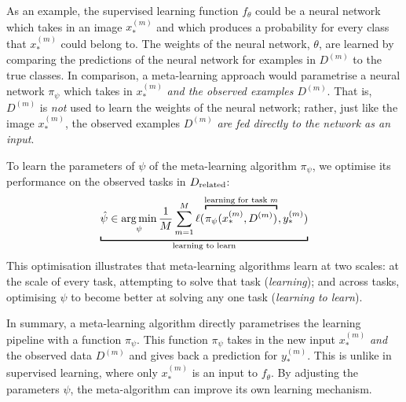 \documentclass[12pt, twoside]{report}
\newcommand{\xrprefix}[1]{xr-#1}
\begin{document}
As an example, the supervised learning function $f_\theta$ could be a neural network %
which takes in an image $\displaystyle x^{(m)}_*$ and which produces a probability for every class that $\displaystyle x^{(m)}_*$ could belong to.
The weights of the neural network, $\theta$, are learned by comparing the predictions of the neural network for examples in $D^{(m)}$ to the true classes.
In comparison, a meta-learning approach would parametrise a neural network $\pi_\psi$ which takes in $\displaystyle x^{(m)}_*$ \emph{and the observed examples $D^{(m)}$}.
That is, $D^{(m)}$ is \emph{not} used to learn the weights of the neural network;
rather, just like the image $\displaystyle x^{(m)}_*$, the observed examples $D^{(m)}$ \emph{are fed directly to the network as an input}.

To learn the parameters of $\psi$ of the meta-learning algorithm $\pi_\psi$, 
we optimise its performance on the observed tasks in $D\ss{related}$:
\begin{equation}
    \underbracket[1pt]{\hat\psi \in \argmin_{\psi} \frac1M \sum_{m=1}^M \ell(
    \overbracket[1pt]{
        \pi_\psi(
            x^{(m)}_*, D^{(m)}
        )
    }^{\text{learning for task $m$}}
    ,
    y^{(m)}_*)}_{\text{learning to learn}}
\end{equation}
This optimisation illustrates that meta-learning algorithms learn at two scales:
at the scale of every task, attempting to solve that task (\emph{learning});
and across tasks,
optimising $\psi$ to become better at solving any one task (\emph{learning to learn}).

In summary, a meta-learning algorithm directly parametrises the learning pipeline with a function $\pi_\psi$.
This function $\pi_\psi$ takes in the new input $\displaystyle x_*^{(m)}$ \emph{and} the observed data $D^{(m)}$ and gives back a prediction for $\displaystyle y_*^{(m)}$.
This is unlike in supervised learning, where only $\displaystyle x_*^{(m)}$ is an input to $f_\theta$.
By adjusting the parameters $\psi$, the meta-algorithm can improve its own learning mechanism.
%
\end{document}
